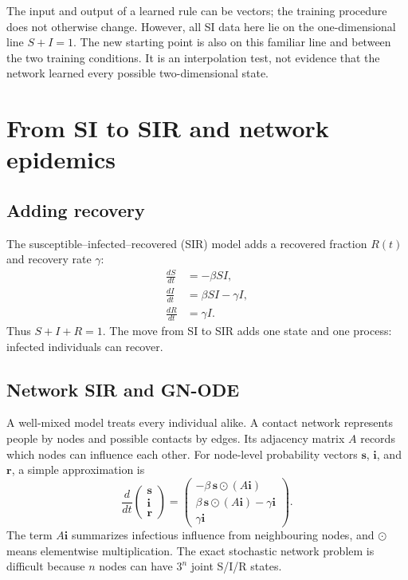 \documentclass[11pt,a4paper]{article}
\begin{document}
The input and output of a learned rule can be vectors; the training procedure
does not otherwise change. However, all SI data here lie on the
one-dimensional line $S+I=1$. The new starting point is also on this familiar
line and between the two training conditions. It is an interpolation test, not
evidence that the network learned every possible two-dimensional state.

\section{From SI to SIR and network epidemics}

\subsection{Adding recovery}

The susceptible--infected--recovered (SIR) model adds a recovered fraction
$R(t)$ and recovery rate $\gamma$:
\begin{align}
\frac{dS}{dt}&=-\beta SI,\\
\frac{dI}{dt}&=\beta SI-\gamma I,\\
\frac{dR}{dt}&=\gamma I.
\end{align}
Thus $S+I+R=1$. The move from SI to SIR adds one state and one process:
infected individuals can recover.

\subsection{Network SIR and GN-ODE}

A well-mixed model treats every individual alike. A contact network represents
people by nodes and possible contacts by edges. Its adjacency matrix $A$
records which nodes can influence each other. For node-level probability
vectors $\mathbf{s}$, $\mathbf{i}$, and $\mathbf{r}$, a simple approximation is
\[
\frac{d}{dt}
\begin{pmatrix}\mathbf{s}\\\mathbf{i}\\\mathbf{r}\end{pmatrix}
=
\begin{pmatrix}
-\beta\,\mathbf{s}\odot(A\mathbf{i})\\
\beta\,\mathbf{s}\odot(A\mathbf{i})-\gamma\mathbf{i}\\
\gamma\mathbf{i}
\end{pmatrix}.
\]
The term $A\mathbf{i}$ summarizes infectious influence from neighbouring nodes,
and $\odot$ means elementwise multiplication. The exact stochastic network
problem is difficult because $n$ nodes can have $3^n$ joint S/I/R states.
\end{document}
